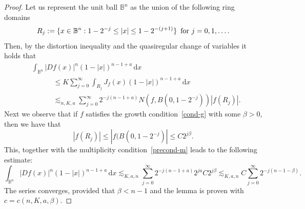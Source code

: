 \documentclass[11pt,a4paper,reqno]{amsart}
\theoremstyle{definition}
\newcommand{\om}{\omega}
\newcommand{\B}{\mathbb{B}^n}
\newcommand{\ud}{\mathrm {d}}
\newcommand{\blue}{\color{blau}}
\newcounter{komcounter}
\numberwithin{komcounter}{section}
\newcommand{\komT}[1]{{\bf \blue [\refstepcounter{komcounter}\thekomcounter (by T): #1]}}
\begin{document}
\begin{proof}
 Let us represent the unit ball $\B$ as the union of the following ring domains 
 $$
  R_j:=\{x\in \B:1-2^{-j}\leq |x| \leq 1-2^{-(j+1)}\}\,\hbox{ for } j=0,1,\ldots.
 $$
 Then, by the distortion inequality and the quasiregular change of variables it holds that
 \begin{align}
   &\int_{\B}|Df(x)|^{n}(1-|x|)^{n-1+a}\,\ud x \nonumber \\
   &\phantom{AAAA} \leq K \sum_{j=0}^{\infty} \int_{R_j}J_f(x)(1-|x|)^{n-1+a}\,\ud x \nonumber \\ 
   &\phantom{AAAA} \lesssim_{n, K, a} \sum_{j=0}^{\infty} 2^{-j(n-1+a)}N(f, B(0, 1-2^{-j})) |f(R_j)|. 
   \label{eq3-lem94}
 \end{align}
 Next we observe that if $f$ satisfies the growth condition~\eqref{cond-g} with some $\beta>0$, then we have that 
\begin{equation} \label{eq4-lem94}
|f(R_j)|\leq |f(B(0, 1-2^{-j})|\leq C2^{j\beta}.
\end{equation}
%
This, together with the multiplicity condition~\eqref{precond-m} leads to the following estimate:
\[
\int_{\B}|Df(x)|^{n}(1-|x|)^{n-1+a}\,\ud x \lesssim_{K, a, n} \sum_{j=0}^{\infty} 2^{-j(n-1+a)}2^{ja} C2^{j\beta}\lesssim_{K, a, n} C \sum_{j=0}^{\infty} 2^{-j(n-1-\beta)}.
\]
The series converges, provided that $\beta<n-1$ and the lemma is proven with $c=c(n,K,a, \beta)$. 


\end{proof}
\end{document}
